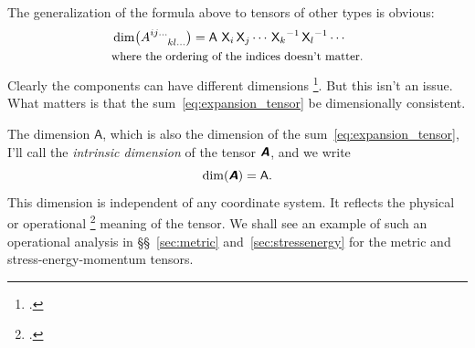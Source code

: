 \documentclass[\ifafour a4paper,12pt,\else a5paper,10pt,\fi%
onecolumn,oneside,article,%
british%
]{memoir}
\theoremstyle{remark}
\theoremstyle{innote}
\newcommand*{\mathte}[1]{\textbf{\textit{\textsf{#1}}}}
\newcommand*{\citep}{\footcites}
\renewcommand*{\|}[1][]{\nonscript\,#1\vert\nonscript\;\mathopen{}}
\newcommand*{\sect}{\S}%
\newcommand*{\sects}{\S\S}%
\newcommand*{\cf}{{cf.}}
\newcommand*{\Un}{\textsf{1}}
\newcommand*{\Le}{\textsf{L}}
\newcommand*{\Ti}{\textsf{T}}
\newcommand*{\Ma}{\textsf{M}}
\newcommand*{\Te}{\Theta}
\newcommand*{\Xx}{\textsf{X}}
\newcommand*{\Aa}{\textsf{A}}
\newcommand*{\yA}{\mathte{A}}
\renewcommand*{\i}{\indices}
\begin{document}
The generalization of the formula above to tensors of other types is obvious:
\begin{equation}
  \label{eq:dim_component_generic}
  \begin{aligned}
&\dim\bigl(A\i{^{ij\dotso}_{kl\dotso}}\bigr) = \Aa\ {\Xx_{i}}\,{\Xx_{j}}\dotsm\,
  {\Xx_{k}}^{-1}\,{\Xx_{l}}^{-1}\dotsm \\
  &\text{\small where the ordering of the indices doesn't matter.}
  \end{aligned}
\end{equation}
Clearly the components can have different dimensions
\citep[\cf\ the discussion in][\sect~IV.5 p.~179]{synge1960b}. But this isn't
an issue. What matters is that the sum~\eqref{eq:expansion_tensor} be
dimensionally consistent.


\medskip

The dimension $\Aa$, which is also the dimension of the
sum~\eqref{eq:expansion_tensor}, I'll call the \emph{intrinsic dimension}
of the tensor $\yA$, and we write
\begin{equation}
  \label{eq:abs_dim}
  \dim(\yA) = \Aa.
\end{equation}
This dimension is independent of any coordinate system. It reflects the
physical or operational \citep{bridgman1927_r1958}[see
also][\sect~A.2]{synge1960}[\sects~A.3--4]{truesdelletal1960} meaning of
the tensor. We shall see an example of such an operational analysis in
\sects~\ref{sec:metric} and~\ref{sec:stressenergy} for the metric and
stress-energy-momentum tensors.
\end{document}
